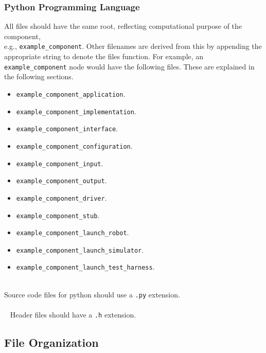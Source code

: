 \documentclass{CSSRforAfrica}
\newcommand{\blank}{~\\}
\begin{document}
\begin{appendices}
\subsubsection{Python Programming Language}
All files should have the same root, reflecting computational purpose of the component, 
\blank
e.g.,  {\small \verb+example_component+}.
Other filenames are derived from this by appending the appropriate string to denote the files function. For example, an {\small \verb+example_component+} node would have the following files. \vspace{-2mm} These are explained in the following sections.
\begin{itemize}
\item {\small \verb+example_component_application+}. \vspace{-2mm}
\item {\small \verb+example_component_implementation+}. \vspace{-2mm}
\item {\small \verb+example_component_interface+}. \vspace{-2mm}
\item {\small \verb+example_component_configuration+}. \vspace{-2mm}
\item {\small \verb+example_component_input+}. \vspace{-2mm}
\item {\small \verb+example_component_output+}. \vspace{-2mm}
\item {\small \verb+example_component_driver+}. \vspace{-2mm}
\item {\small \verb+example_component_stub+}. \vspace{-2mm}
\item {\small \verb+example_component_launch_robot+}. \vspace{-2mm}
\item {\small \verb+example_component_launch_simulator+}. \vspace{-2mm}
\item {\small \verb+example_component_launch_test_harness+}. \vspace{-2mm}
\end{itemize}
\blank
 {\noindent Source code files for python should use a  {\small \verb+.py+} extension.}
~
\blank
~
\blank
~
Header files should have a {\small \verb+.h+} extension.
 
 \newpage
\subsection{File Organization}
 \label{section:file_organization}


\end{appendices}
\end{document}
